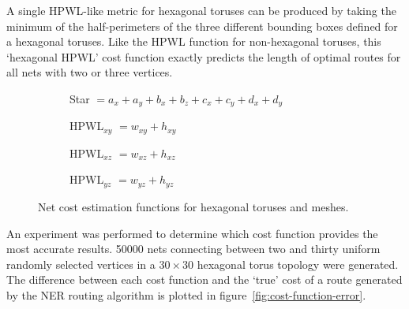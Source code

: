 				A single HPWL-like metric for hexagonal toruses can be produced by
				taking the minimum of the half-perimeters of the three different
				bounding boxes defined for a hexagonal toruses. Like the HPWL function
				for non-hexagonal toruses, this `hexagonal HPWL' cost function exactly
				predicts the length of optimal routes for all nets with two or three
				vertices.
				
				\begin{figure}
					\center
					\begin{subfigure}[b]{\linewidth}
						\center
						
						\caption{Star $= a_x + a_y + b_x + b_z + c_x + c_y + d_x + d_y$}
						\label{fig:cost-function-star}
					\end{subfigure}
					
					\vspace*{1.5em}
					
					\begin{subfigure}[b]{0.32\linewidth}
						\center
						
						\caption{HPWL$_{xy}$ $= w_{xy} + h_{xy}$}
						\label{fig:cost-function-hpwl-xy}
					\end{subfigure}
					\begin{subfigure}[b]{0.32\linewidth}
						\center
						
						\caption{HPWL$_{xz}$ $= w_{xz} + h_{xz}$}
						\label{fig:cost-function-hpwl-xz}
					\end{subfigure}
					\begin{subfigure}[b]{0.32\linewidth}
						\center
						
						\caption{HPWL$_{yz}$ $= w_{yz} + h_{yz}$}
						\label{fig:cost-function-hpwl-yz}
					\end{subfigure}
					
					\caption[Net cost estimation functions for hexagonal toruses.]%
					{Net cost estimation functions for hexagonal toruses and meshes.}
					\label{fig:cost-function}
				\end{figure}
				
				An experiment was performed to determine which cost function provides
				the most accurate results. \num{50000} nets connecting between two and
				thirty uniform randomly selected vertices in a $30\times30$ hexagonal
				torus topology were generated. The difference between each cost
				function and the `true' cost of a route generated by the NER routing
				algorithm is plotted in figure~\ref{fig:cost-function-error}.
				
